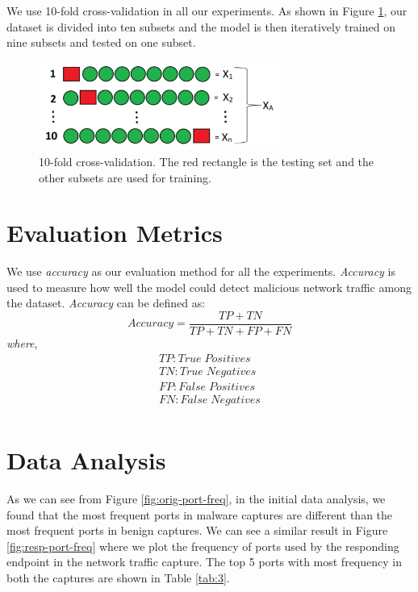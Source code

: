 We use 10-fold cross-validation in all our experiments. As shown in Figure \ref{fig:10-fold}, our dataset is divided into ten subsets and the model is then iteratively trained on nine subsets and tested on one subset.

\begin{figure}[htb]
	\centering
	\includegraphics[width=0.7\textwidth]{images/k-fold.png}
	\caption{10-fold cross-validation. The red rectangle is the testing set and the other subsets are used for training.} 
	\label{fig:10-fold}
\end{figure}

\section{Evaluation Metrics}

We use \emph{accuracy} as our evaluation method for all the experiments. \emph{Accuracy} is used to measure how well the model could detect malicious network traffic among the dataset. \emph{Accuracy} can be defined as:
$$
Accuracy = \dfrac{TP + TN}{ TP + TN + FP + FN}
$$
\emph{where},
\begin{align*}
	TP: True\;Positives \\
	TN: True\;Negatives\\
	FP: False\;Positives\\
	FN: False\;Negatives\\
\end{align*}

\section{Data Analysis}

As we can see from Figure \ref{fig:orig-port-freq}, in the initial data analysis, we found that the most frequent ports in malware captures are different than the most frequent ports in benign captures. We can see a similar result in Figure \ref{fig:resp-port-freq} where we plot the frequency of ports used by the responding endpoint in the network traffic capture. The top 5 ports with most frequency in both the captures are shown in Table \ref{tab:3}.

